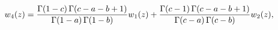 \[w_{4}(z)=\frac{\mathop{\Gamma\/}\nolimits\!\left(1-c\right)\mathop{\Gamma\/}%
\nolimits\!\left(c-a-b+1\right)}{\mathop{\Gamma\/}\nolimits\!\left(1-a\right)%
\mathop{\Gamma\/}\nolimits\!\left(1-b\right)}w_{1}(z)+\frac{\mathop{\Gamma\/}%
\nolimits\!\left(c-1\right)\mathop{\Gamma\/}\nolimits\!\left(c-a-b+1\right)}{%
\mathop{\Gamma\/}\nolimits\!\left(c-a\right)\mathop{\Gamma\/}\nolimits\!\left(%
c-b\right)}w_{2}(z),\]